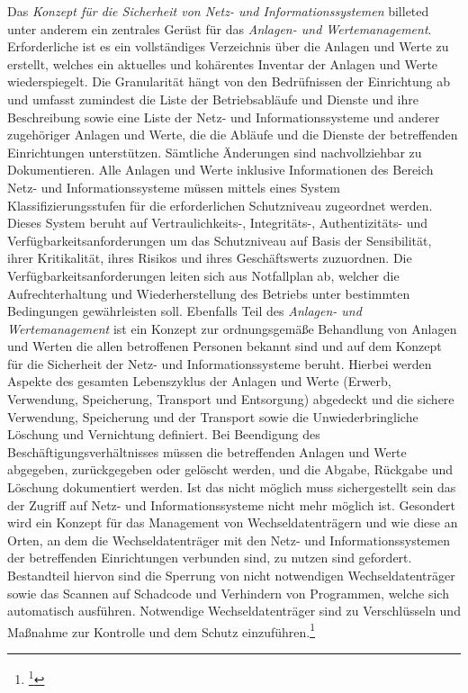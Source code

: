 \documentclass[11pt,a4paper,hidelinks]{article}   %
\begin{document}
                Das \emph{Konzept für die Sicherheit von Netz- und Informationssystemen} billeted unter anderem ein zentrales Gerüst für das \emph{Anlagen- und Wertemanagement}. Erforderliche ist es ein vollständiges Verzeichnis über die Anlagen und Werte zu erstellt, welches ein aktuelles und kohärentes Inventar der Anlagen und Werte wiederspiegelt. Die Granularität hängt von den Bedrüfnissen der Einrichtung ab und umfasst zumindest die Liste der Betriebsabläufe und Dienste und ihre Beschreibung sowie eine Liste der Netz- und Informationssysteme und anderer zugehöriger Anlagen und Werte, die die Abläufe und die Dienste der betreffenden Einrichtungen unterstützen. Sämtliche Änderungen sind nachvollziehbar zu Dokumentieren. Alle Anlagen und Werte inklusive Informationen des Bereich Netz- und Informationssysteme müssen mittels eines System Klassifizierungsstufen für die erforderlichen Schutzniveau zugeordnet werden. Dieses System beruht auf Vertraulichkeits-, Integritäts-, Authentizitäts- und Verfügbarkeitsanforderungen um das Schutzniveau auf Basis der Sensibilität, ihrer Kritikalität, ihres Risikos und ihres Geschäftswerts zuzuordnen. Die          Verfügbarkeitsanforderungen leiten sich aus Notfallplan ab, welcher die Aufrechterhaltung und Wiederherstellung des Betriebs unter bestimmten Bedingungen gewährleisten soll. Ebenfalls Teil des \emph{Anlagen- und Wertemanagement} ist ein Konzept zur ordnungsgemäße Behandlung von Anlagen und Werten die allen betroffenen Personen bekannt sind und auf dem Konzept für die Sicherheit der Netz- und Informationssysteme beruht. Hierbei werden Aspekte des gesamten Lebenszyklus der Anlagen und Werte (Erwerb, Verwendung, Speicherung, Transport und Entsorgung) abgedeckt und die sichere Verwendung, Speicherung und der Transport sowie die Unwiederbringliche Löschung und Vernichtung definiert. Bei Beendigung des Beschäftigungsverhältnisses müssen die betreffenden Anlagen und Werte abgegeben, zurückgegeben oder gelöscht werden, und die Abgabe, Rückgabe und Löschung dokumentiert werden. Ist das nicht möglich muss sichergestellt sein das der Zugriff auf Netz- und Informationssysteme nicht mehr möglich ist. Gesondert wird ein Konzept für das Management von Wechseldatenträgern und wie diese an Orten, an dem die Wechseldatenträger mit den Netz- und Informationssystemen der betreffenden Einrichtungen verbunden sind, zu nutzen sind gefordert. Bestandteil hiervon sind die Sperrung von nicht notwendigen Wechseldatenträger sowie das Scannen auf Schadcode und Verhindern von Programmen, welche sich automatisch ausführen. Notwendige Wechseldatenträger sind zu Verschlüsseln und Maßnahme zur Kontrolle und dem Schutz einzuführen.\footnote{
                    \footcite[Vgl. Anhang, Nummer 12][]{EU2024-2690}
                }\medbreak
\end{document}
